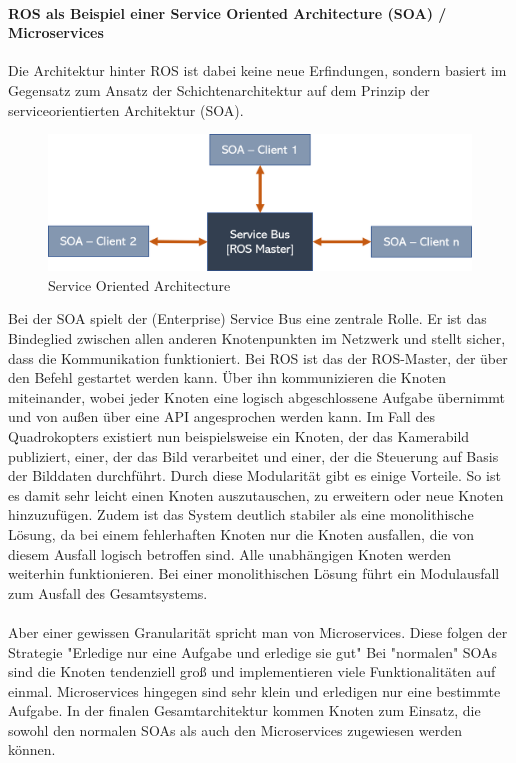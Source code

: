 \paragraph{ROS als Beispiel einer Service Oriented Architecture (SOA) / Microservices}
Die Architektur hinter ROS ist dabei keine neue Erfindungen, sondern basiert im Gegensatz zum Ansatz der Schichtenarchitektur auf dem Prinzip der serviceorientierten Architektur (SOA). 
\begin{figure}[h]
	\centering
	\includegraphics[scale=0.5]{"Grafiken/soa.png"}
	\caption{Service Oriented Architecture}
	\label{fig:meine-grafik}
\end{figure}
Bei der SOA spielt der (Enterprise) Service Bus eine zentrale Rolle. Er ist das Bindeglied zwischen allen anderen Knotenpunkten im Netzwerk und stellt sicher, dass die Kommunikation funktioniert. Bei ROS ist das der ROS-Master, der über den Befehl  gestartet werden kann. Über ihn kommunizieren die Knoten miteinander, wobei jeder Knoten eine logisch abgeschlossene Aufgabe übernimmt und von außen über eine API angesprochen werden kann. Im Fall des Quadrokopters existiert nun beispielsweise ein Knoten, der das Kamerabild publiziert, einer, der das Bild verarbeitet und einer, der die Steuerung auf Basis der Bilddaten durchführt. Durch diese Modularität gibt es einige Vorteile. So ist es damit sehr leicht einen Knoten auszutauschen, zu erweitern oder neue Knoten hinzuzufügen. Zudem ist das System deutlich stabiler als eine monolithische Lösung, da bei einem fehlerhaften Knoten nur die Knoten ausfallen, die von diesem Ausfall logisch betroffen sind. Alle unabhängigen Knoten werden weiterhin funktionieren. Bei einer monolithischen Lösung führt ein Modulausfall zum Ausfall des Gesamtsystems. 
\paragraph{}
Aber einer gewissen Granularität spricht man von Microservices. Diese folgen der Strategie 
"Erledige nur eine Aufgabe und erledige sie gut" %
Bei "normalen" SOAs sind die Knoten tendenziell groß und implementieren viele Funktionalitäten auf einmal. Microservices hingegen sind sehr klein und erledigen nur eine bestimmte Aufgabe. In der finalen Gesamtarchitektur kommen Knoten zum Einsatz, die sowohl den normalen SOAs als auch den Microservices zugewiesen werden können.



